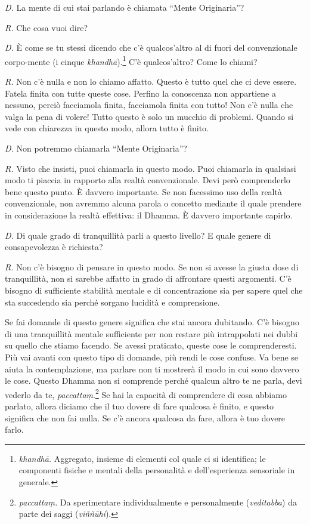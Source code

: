 \emph{D.} La mente di cui stai parlando è chiamata ``Mente Originaria''?

\emph{R.} Che cosa vuoi dire?

\emph{D.} È come se tu stessi dicendo che c'è qualcos'altro al di fuori del
convenzionale corpo-mente (i cinque \emph{khandhā}).\footnote{\emph{khandhā.}
  Aggregato, insieme di elementi col quale ci si identifica; le
  componenti fisiche e mentali della personalità e dell'esperienza
  sensoriale in generale.} C'è qualcos'altro? Come lo chiami?

\emph{R.} Non c'è nulla e non lo chiamo affatto. Questo è tutto quel che ci
deve essere. Fatela finita con tutte queste cose. Perfino la conoscenza
non appartiene a nessuno, perciò facciamola finita, facciamola finita
con tutto! Non c'è nulla che valga la pena di volere! Tutto questo è
solo un mucchio di problemi. Quando si vede con chiarezza in questo
modo, allora tutto è finito.

\emph{D.} Non potremmo chiamarla ``Mente Originaria''?

\emph{R.} Visto che insisti, puoi chiamarla in questo modo. Puoi chiamarla in
qualsiasi modo ti piaccia in rapporto alla realtà convenzionale. Devi
però comprenderlo bene questo punto. È davvero importante. Se non
facessimo uso della realtà convenzionale, non avremmo alcuna parola o
concetto mediante il quale prendere in considerazione la realtà
effettiva: il Dhamma. È davvero importante capirlo.

\emph{D.} Di quale grado di tranquillità parli a questo livello? E quale
genere di consapevolezza è richiesta?

\emph{R.} Non c'è bisogno di pensare in questo modo. Se non si avesse la
giusta dose di tranquillità, non si sarebbe affatto in grado di
affrontare questi argomenti. C'è bisogno di sufficiente stabilità
mentale e di concentrazione sia per sapere quel che sta succedendo sia
perché sorgano lucidità e comprensione.

Se fai domande di questo genere significa che stai ancora dubitando. C'è
bisogno di una tranquillità mentale sufficiente per non restare più
intrappolati nei dubbi su quello che stiamo facendo. Se avessi
praticato, queste cose le comprenderesti. Più vai avanti con questo tipo
di domande, più rendi le cose confuse. Va bene se aiuta la
contemplazione, ma parlare non ti mostrerà il modo in cui sono davvero
le cose. Questo Dhamma non si comprende perché qualcun altro te ne
parla, devi vederlo da te, \emph{paccattaṃ}.\footnote{\emph{paccattaṃ.}
  Da sperimentare individualmente e personalmente (\emph{veditabba}) da
  parte dei saggi (\emph{viññūhi}).} Se hai la capacità di comprendere
di cosa abbiamo parlato, allora diciamo che il tuo dovere di fare
qualcosa è finito, e questo significa che non fai nulla. Se c'è ancora
qualcosa da fare, allora è tuo dovere farlo.


